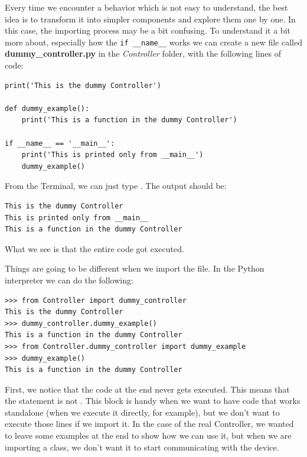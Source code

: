 Every time we encounter a behavior which is not easy to understand, the best idea is to transform it into simpler components and explore them one by one. In this case, the importing process may be a bit confusing. To understand it a bit more about, especially how the \texttt{if __name__} works we can create a new file called \textbf{dummy\_controller.py} in the \emph{Controller} folder, with the following lines of code:

\begin{verbatim}
print('This is the dummy Controller')

def dummy_example():
    print('This is a function in the dummy Controller')

if __name__ == '__main__':
    print('This is printed only from __main__')
    dummy_example()

\end{verbatim}

\sloppy From the Terminal, we can just type . The output should be:

\begin{verbatim}
This is the dummy Controller
This is printed only from __main__
This is a function in the dummy Controller
\end{verbatim}

What we see is that the entire code got executed.


Things are going to be different when we import the file. In the Python interpreter we can do the following:

\begin{verbatim}
>>> from Controller import dummy_controller
This is the dummy Controller
>>> dummy_controller.dummy_example()
This is a function in the dummy Controller
>>> from Controller.dummy_controller import dummy_example
>>> dummy_example()
This is a function in the dummy Controller
\end{verbatim}

First, we notice that the code at the end never gets executed. This means that the  statement is not . This block is handy when we want to have code that works standalone (when we execute it directly, for example), but we don't want to execute those lines if we import it. In the case of the real Controller, we wanted to leave some examples at the end to show how we can use it, but when we are importing a class, we don't want it to start communicating with the device.

